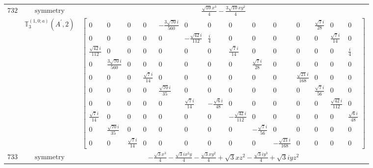 \documentclass[fleqn,8pt,landscape]{jsarticle}
\begin{document}
\begin{longtable}{ccc}
$ 732 $ & $ \text{symmetry} $ & $ \frac{\sqrt{10} x^{3}}{4} - \frac{3 \sqrt{10} x y^{2}}{4} $ \\
$  $ & $ \mathbb{T}_{3}^{(1,0;a)}(A^{\prime},2) $ & $ \begin{bmatrix} 0 & 0 & 0 & 0 & - \frac{3 \sqrt{70} i}{560} & 0 & 0 & 0 & 0 & 0 & 0 & \frac{\sqrt{7} i}{28} & 0 & 0 \\ 0 & 0 & 0 & 0 & 0 & - \frac{\sqrt{42} i}{112} & \frac{i}{4} & 0 & 0 & 0 & 0 & 0 & \frac{\sqrt{7} i}{14} & 0 \\ \frac{\sqrt{42} i}{112} & 0 & 0 & 0 & 0 & 0 & 0 & \frac{\sqrt{7} i}{14} & 0 & 0 & 0 & 0 & 0 & \frac{i}{4} \\ 0 & \frac{3 \sqrt{70} i}{560} & 0 & 0 & 0 & 0 & 0 & 0 & \frac{\sqrt{7} i}{28} & 0 & 0 & 0 & 0 & 0 \\ 0 & 0 & 0 & \frac{\sqrt{7} i}{14} & 0 & 0 & 0 & 0 & 0 & 0 & \frac{\sqrt{21} i}{168} & 0 & 0 & 0 \\ 0 & 0 & 0 & 0 & \frac{\sqrt{70} i}{35} & 0 & 0 & 0 & 0 & 0 & 0 & \frac{\sqrt{7} i}{56} & 0 & 0 \\ 0 & 0 & 0 & 0 & 0 & \frac{\sqrt{7} i}{14} & - \frac{\sqrt{6} i}{48} & 0 & 0 & 0 & 0 & 0 & \frac{\sqrt{42} i}{112} & 0 \\ \frac{\sqrt{7} i}{14} & 0 & 0 & 0 & 0 & 0 & 0 & - \frac{\sqrt{42} i}{112} & 0 & 0 & 0 & 0 & 0 & \frac{\sqrt{6} i}{48} \\ 0 & \frac{\sqrt{70} i}{35} & 0 & 0 & 0 & 0 & 0 & 0 & - \frac{\sqrt{7} i}{56} & 0 & 0 & 0 & 0 & 0 \\ 0 & 0 & \frac{\sqrt{7} i}{14} & 0 & 0 & 0 & 0 & 0 & 0 & - \frac{\sqrt{21} i}{168} & 0 & 0 & 0 & 0 \end{bmatrix} $ \\ \hline
$ 733 $ & $ \text{symmetry} $ & $ - \frac{\sqrt{3} x^{3}}{4} - \frac{\sqrt{3} i x^{2} y}{4} - \frac{\sqrt{3} x y^{2}}{4} + \sqrt{3} x z^{2} - \frac{\sqrt{3} i y^{3}}{4} + \sqrt{3} i y z^{2} $ \\

\end{longtable}
\end{document}
